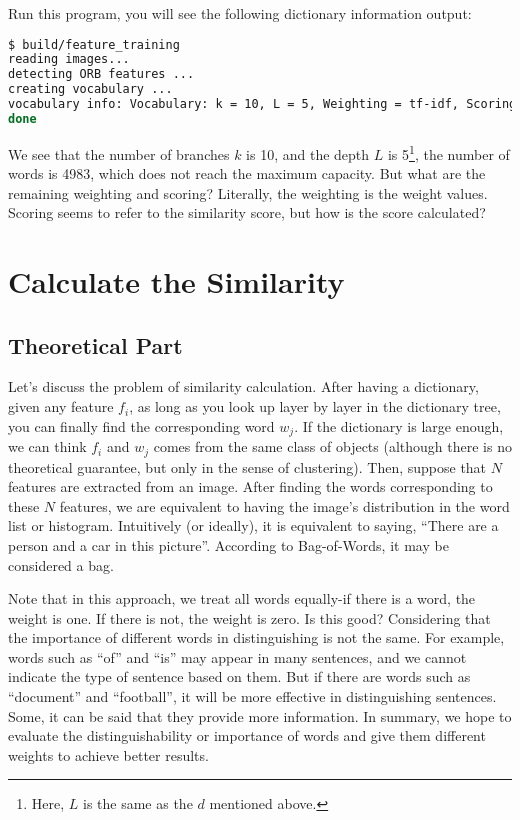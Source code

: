 Run this program, you will see the following dictionary information output:
\begin{lstlisting}[language=sh,caption=Terminal output:]
$ build/feature_training
reading images...
detecting ORB features ...
creating vocabulary ...
vocabulary info: Vocabulary: k = 10, L = 5, Weighting = tf-idf, Scoring = L1-norm, Number of words = 4983
done
\end{lstlisting}
We see that the number of branches $k$ is 10, and the depth $L$ is 5\footnote{Here, $L$ is the same as the $d$ mentioned above. }, the number of words is 4983, which does not reach the maximum capacity. But what are the remaining weighting and scoring? Literally, the weighting is the weight values. Scoring seems to refer to the similarity score, but how is the score calculated?


\section{Calculate the Similarity}
\subsection{Theoretical Part}
Let's discuss the problem of similarity calculation. After having a dictionary, given any feature $f_i$, as long as you look up layer by layer in the dictionary tree, you can finally find the corresponding word $w_j$. If the dictionary is large enough, we can think $f_i$ and $ w_j$ comes from the same class of objects (although there is no theoretical guarantee, but only in the sense of clustering). Then, suppose that $N$ features are extracted from an image. After finding the words corresponding to these $N$ features, we are equivalent to having the image's distribution in the word list or histogram. Intuitively (or ideally), it is equivalent to saying, ``There are a person and a car in this picture''. According to Bag-of-Words, it may be considered a bag.

Note that in this approach, we treat all words equally-if there is a word, the weight is one. If there is not, the weight is zero. Is this good? Considering that the importance of different words in distinguishing is not the same. For example, words such as ``of'' and ``is'' may appear in many sentences, and we cannot indicate the type of sentence based on them. But if there are words such as ``document'' and ``football'', it will be more effective in distinguishing sentences. Some, it can be said that they provide more information. In summary, we hope to evaluate the distinguishability or importance of words and give them different weights to achieve better results.

